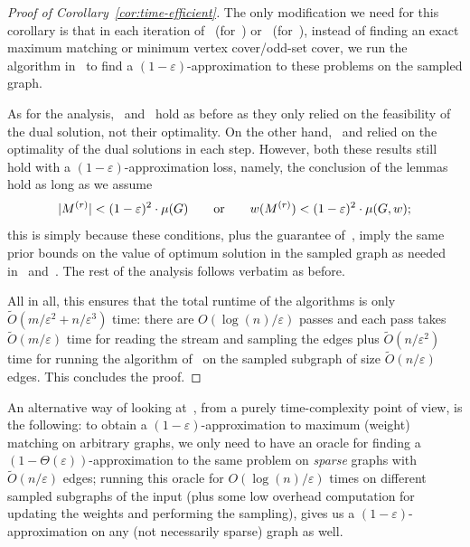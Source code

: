 \documentclass{theoretics}
\DeclarePairedDelimiter{\card}{\vert}{\vert}
\newcommand{\Ot}{\widetilde{O}}
\newcommand{\eps}{\varepsilon}
\begin{document}
\begin{proof}[Proof of Corollary~\ref{cor:time-efficient}]
	The only modification we need for this corollary is that in each iteration of~ (for~) or~ (for~), instead of finding an exact maximum matching or minimum vertex cover/odd-set cover, 
	we run the algorithm in~ to find a $(1-\eps)$-approximation to these problems on the sampled graph. 
	
	As for the analysis,~ and~ hold as before as they only relied on the feasibility of the dual solution, not their optimality. On the other hand,~ and
	 relied on the optimality of the dual solutions in each step. However, both these results still hold with a $(1-\eps)$-approximation loss, namely, the conclusion of the lemmas hold as long as we assume
	\[
		\card{{M^{(r)}}} < (1-\eps)^2 \cdot \mu(G) \qquad \text{or} \qquad w({M^{(r)}}) < (1-\eps)^2 \cdot \mu(G,w);
	\]
	this is simply because these conditions, plus the guarantee of~, imply the same prior bounds on the value of optimum solution in the sampled graph as needed in~ and~. 
	The rest of the analysis follows verbatim as before. 
	
	All in all, this ensures that the total runtime of the algorithms is only $\Ot(m/\eps^2 + n/\eps^3)$ time: there are $O(\log{(n)}/\eps)$ passes 
	and each pass takes $\Ot(m/\eps)$ time for reading the stream and sampling the edges plus $\Ot(n/\eps^2)$ time for running the algorithm of~\cite{DuanP14} on the sampled subgraph of size $\Ot(n/\eps)$ edges. This concludes the proof. 
\end{proof}

An alternative way of looking at~, from a purely time-complexity point of view, is the following: to obtain a $(1-\eps)$-approximation to maximum (weight) matching on arbitrary graphs, 
we only need to have an oracle for finding a $(1-\Theta(\eps))$-approximation to the same problem on \emph{sparse} graphs with $\Ot(n/\eps)$ edges; running this oracle for $O(\log{(n)}/\eps)$ times on different sampled subgraphs of the input (plus some
low overhead computation for updating the weights and performing the sampling), gives us a $(1-\eps)$-approximation on any (not necessarily sparse) graph as well. 
\end{document}

